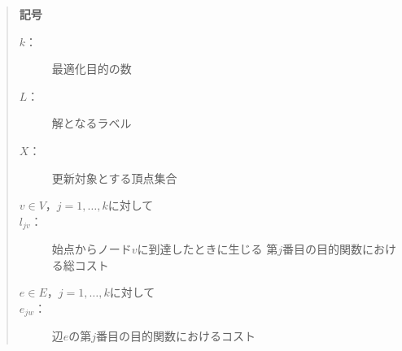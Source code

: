 \documentclass[12pt]{optlab-bachelor}
\begin{document}
\begin{quote}
  \textbf{記号}
  \begin{description}
    \item[$k$：] 最適化目的の数
    \item[$L$：] 解となるラベル
    \item[$X$：] 更新対象とする頂点集合
    \item[$v \in V$，$j = 1 , \ldots , k$に対して]
    \item[$l_{jv}$：] 始点からノード$v$に到達したときに生じる
    第$j$番目の目的関数における総コスト
    \item[$e \in E$，$j = 1 , \ldots , k$に対して]
    \item[$e_{jw}$：] 辺$e$の第$j$番目の目的関数におけるコスト
  \end{description}
\end{quote}
\end{document}
